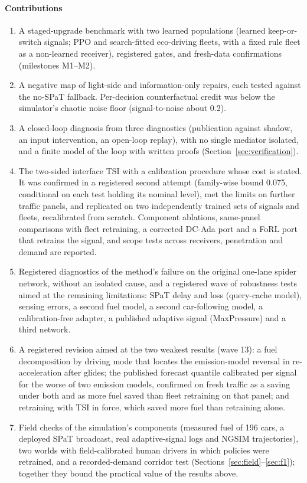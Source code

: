 \paragraph{Contributions}
\begin{enumerate}\setlength\itemsep{1pt}
\item A staged-upgrade benchmark with two learned populations (learned keep-or-switch signals; PPO and search-fitted eco-driving fleets,
with a fixed rule fleet as a non-learned receiver), registered gates, and fresh-data confirmations (milestones M1--M2).
\item A negative map of light-side and information-only repairs, each tested against the no-SPaT fallback. Per-decision counterfactual
credit was below the simulator's chaotic noise floor (signal-to-noise about 0.2).
\item A closed-loop diagnosis from three diagnostics (publication against shadow, an input intervention, an open-loop replay), with no
single mediator isolated, and a finite model of the loop with written proofs (Section~\ref{sec:verification}).
\item The two-sided interface TSI with a calibration procedure whose cost is stated. It was confirmed in a registered second attempt
(family-wise bound 0.075, conditional on each test holding its nominal level), met the limits on further traffic panels, and replicated
on two independently trained sets of signals and fleets, recalibrated from scratch. Component ablations, same-panel comparisons with fleet retraining, a corrected DC-Ada port and a FoRL port that retrains the signal, and scope
tests across receivers, penetration and demand are reported.
\item Registered diagnostics of the method's failure on the original one-lane spider network, without an isolated cause, and a registered wave of robustness tests aimed at the
remaining limitations: SPaT delay and loss (query-cache model), sensing errors, a second fuel model, a second car-following model, a calibration-free
adapter, a published adaptive signal (MaxPressure) and a third network.
\item A registered revision aimed at the two weakest results (wave 13): a fuel decomposition by driving mode that locates the
emission-model reversal in re-acceleration after glides; the published forecast quantile calibrated per signal for the worse of two
emission models, confirmed on fresh traffic as a saving under both and as more fuel saved than fleet retraining on that panel; and
retraining with TSI in force, which saved more fuel than retraining alone.
\item Field checks of the simulation's components (measured fuel of 196 cars, a deployed SPaT broadcast, real adaptive-signal logs and
NGSIM trajectories), two worlds with field-calibrated human drivers in which policies were retrained, and a recorded-demand corridor test
(Sections~\ref{sec:field}--\ref{sec:f1}); together they bound the practical value of the results above.
\end{enumerate}

